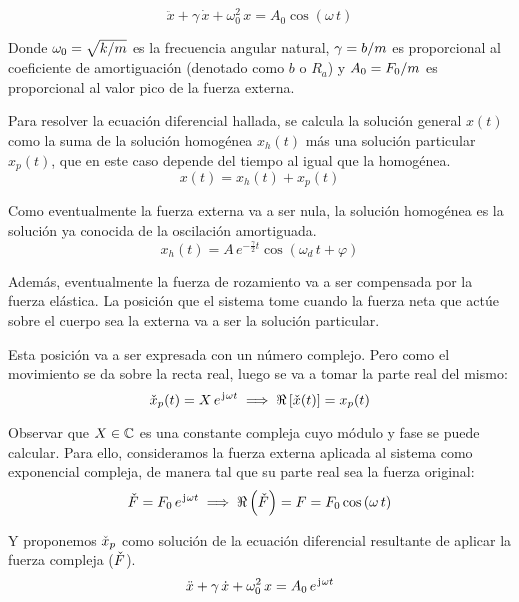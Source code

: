 \begin{mdframed}[style=DefinitionFrame]
    \begin{defn}
    \end{defn}
    \begin{equation*}
        \ddot{x} + \gamma \, \dot{x} + \omega_0^2 \, x  = A_0 \cos \left( \omega \, t \right)
    \end{equation*}
\end{mdframed}

Donde $\omega_0 = \sqrt{k/m}$ es la frecuencia angular natural, $\gamma = b/m$ es proporcional al coeficiente de amortiguación (denotado como $b$ o $R_a$) y $A_0=F_0/m$ es proporcional al valor pico de la fuerza externa.

Para resolver la ecuación diferencial hallada, se calcula la solución general $x(t)$ como la suma de la solución homogénea $x_h(t)$ más una solución particular $x_p(t)$, que en este caso depende del tiempo al igual que la homogénea.
\[
    x(t) = x_h(t) + x_p(t)
\]

Como eventualmente la fuerza externa va a ser nula, la solución homogénea es la solución ya conocida de la oscilación amortiguada.
\[
    x_h(t) = A \, e^{-\tfrac{\gamma}{2}t} \cos(\omega_d \, t + \varphi)
\]

Además, eventualmente la fuerza de rozamiento va a ser compensada por la fuerza elástica.
La posición que el sistema tome cuando la fuerza neta que actúe sobre el cuerpo sea la externa va a ser la solución particular.

Esta posición va a ser expresada con un número complejo.
Pero como el movimiento se da sobre la recta real, luego se va a tomar la parte real del mismo:
\[
    \check{x}_p(t) = X \, e^{\mkern2mu\mathrm{j}\mkern1mu \omega t} \implies \Re \left[ \check{x} (t) \right] = x_p(t)
\]

Observar que $X \in \mathbb{C}$ es una constante compleja cuyo módulo y fase se puede calcular.
Para ello, consideramos la fuerza externa aplicada al sistema como exponencial compleja, de manera tal que su parte real sea la fuerza original:
\[
    \check{F} = F_0 \, e^{\mkern2mu\mathrm{j}\mkern1mu \omega t} \implies \Re \left( \check{F} \right) = F = F_0 \cos \left( \omega \, t \right)
\]

Y proponemos $\check{x}_p$ como solución de la ecuación diferencial resultante de aplicar la fuerza compleja ($\check{F}$).
\[
    \ddot{x} + \gamma \, \dot{x} + \omega_0^2 \, x  = A_0 \, e^{\mkern2mu\mathrm{j}\mkern1mu \omega t}
\]

